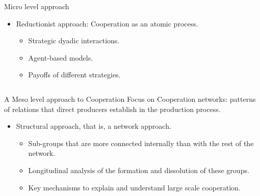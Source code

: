 \documentclass[ignorenonframetext,red,8pt,notes=show]{beamer}
\begin{document}
\begin{frame}[label=]
\begin{columns}[c]
\begin{column}{0.5\textwidth}
\begin{block}{Micro level approach}
\begin{itemize}
\item Reductionist approach: Cooperation as an atomic process.

\begin{itemize}

\item Strategic dyadic interactions.
\item Agent-based models.
\item Payoffs of different strategies.

\end{itemize}
\end{itemize}

\end{block}

\end{column}
\end{columns}

\pause

\begin{block}{A Meso level approach to Cooperation}
Focus on Cooperation networks: patterns of relations that direct producers establish in the production process.
\begin{itemize}

\item Structural approach, that is, a network approach.

\begin{itemize}

\item Sub-groups that are more connected internally than with the rest of the network. 
\item Longitudinal analysis of the formation and dissolution of these groups.
\item Key mechanisms to explain and understand large scale cooperation.

\end{itemize}
\end{itemize}
\end{block}

\end{frame}
\end{document}
